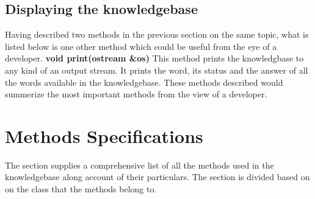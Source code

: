 \subsection*{Displaying the knowledgebase}
Having described two methods in the previous section on the same topic, what is listed below is one other method which could be useful from the eye of a developer. \vskip 2pt
\textbf{void print(ostream \&os)} \vskip 1pt
This method prints the knowledgbase to any kind of an output stream. It prints the word, its status and the answer of all the words available in the knowledgebase.
\vskip 1pt
These methods described would summerize the most important methods from the view of a developer.
	
\section{Methods Specifications}
The section supplies a comprehensive list of all the methods used in the knowledgebase along account of their particulars. The section is divided based on on the class that the methods belong to.
